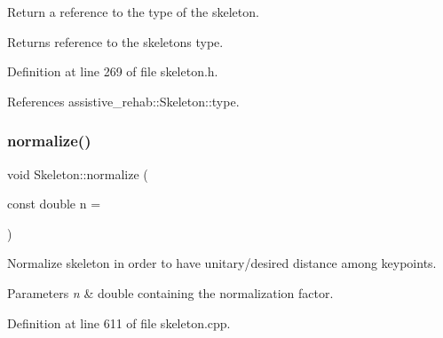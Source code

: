 Return a reference to the type of the skeleton. 

\begin{DoxyReturn}{Returns}
reference to the skeleton\textquotesingle{}s type. 
\end{DoxyReturn}


Definition at line 269 of file skeleton.\+h.


\begin{DoxyCode}{0}

\end{DoxyCode}


References assistive\+\_\+rehab\+::\+Skeleton\+::type.

\mbox{\label{classassistive__rehab_1_1Skeleton_a7753cc8d2b43e27eaf7bf9ef640a99cb}} 
\subsubsection{\texorpdfstring{normalize()}{normalize()}}
{\footnotesize\ttfamily void Skeleton\+::normalize (\begin{DoxyParamCaption}\item[{const double}]{n = {} }\end{DoxyParamCaption})\hspace{0.3cm}{\ttfamily [inherited]}}



Normalize skeleton in order to have unitary/desired distance among keypoints. 


\begin{DoxyParams}{Parameters}
{\em n} & double containing the normalization factor. \\
\hline
\end{DoxyParams}


Definition at line 611 of file skeleton.\+cpp.


\begin{DoxyCode}{0}

\end{DoxyCode}


